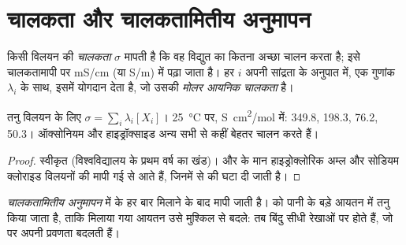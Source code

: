 \section{चालकता और चालकतामितीय अनुमापन}

\begin{definition}\label{def:g12:ph-conductivity-titrations:conductivity}
किसी विलयन की \emph{चालकता} $\sigma$
मापती है कि वह विद्युत का कितना अच्छा चालन करता है; इसे चालकतामापी पर
\si{mS/cm} (या \si{S/m}) में पढ़ा जाता है। हर  $i$ अपनी सांद्रता के
अनुपात में, एक गुणांक $\lambda_i$ के साथ, इसमें योगदान देता है, जो उसकी
\emph{मोलर आयनिक चालकता} है।
\end{definition}

\begin{proposition}[कोलराउश नियम]\label{prop:g12:ph-conductivity-titrations:kohlrausch}
तनु विलयन के लिए $\sigma = \sum_i \lambda_i [X_i]$।
\qty{25}{\celsius} पर, \si{S.cm^2/mol} में:  349.8,  198.3,
 76.2,  50.3। ऑक्सोनियम और हाइड्रॉक्साइड  अन्य सभी  से
कहीं बेहतर चालन करते हैं।
\end{proposition}

\begin{proof}
स्वीकृत (विश्वविद्यालय के प्रथम वर्ष का खंड)।  और  के मान
हाइड्रोक्लोरिक अम्ल और सोडियम क्लोराइड विलयनों की मापी गई  से आते हैं,
जिनमें से  की  घटा दी जाती है।
\end{proof}

\begin{definition}[चालकतामितीय अनुमापन]\label{def:g12:ph-conductivity-titrations:conductimetric}
\emph{चालकतामितीय अनुमापन} में
 के हर बार मिलाने के बाद  मापी जाती है।  को पानी के बड़े आयतन में तनु किया जाता है, ताकि मिलाया गया
आयतन उसे मुश्किल से बदले: तब बिंदु सीधी रेखाओं पर होते हैं, जो
 पर अपनी प्रवणता बदलती हैं।
\end{definition}

